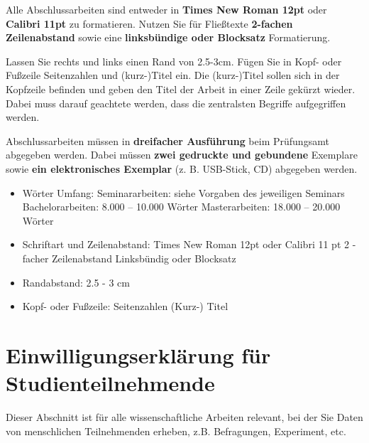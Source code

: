 \documentclass[
  letterpaper,
  DIV=11]{scrreprt}
\begin{document}
Alle Abschlussarbeiten sind entweder in \textbf{Times New Roman 12pt}
oder \textbf{Calibri 11pt} zu formatieren. Nutzen Sie für Fließtexte
\textbf{2-fachen Zeilenabstand} sowie eine \textbf{linksbündige oder
Blocksatz} Formatierung.

Lassen Sie rechts und links einen Rand von 2.5-3cm. Fügen Sie in Kopf-
oder Fußzeile Seitenzahlen und (kurz-)Titel ein. Die (kurz-)Titel sollen
sich in der Kopfzeile befinden und geben den Titel der Arbeit in einer
Zeile gekürzt wieder. Dabei muss darauf geachtete werden, dass die
zentralsten Begriffe aufgegriffen werden.

Abschlussarbeiten müssen in \textbf{dreifacher Ausführung} beim
Prüfungsamt abgegeben werden. Dabei müssen \textbf{zwei gedruckte und
gebundene} Exemplare sowie \textbf{ein elektronisches Exemplar} (z. B.
USB-Stick, CD) abgegeben werden.

\begin{tcolorbox}[enhanced jigsaw, rightrule=.15mm, colframe=quarto-callout-note-color-frame, opacityback=0, toptitle=1mm, colbacktitle=quarto-callout-note-color!10!white, breakable, titlerule=0mm, colback=white, arc=.35mm, toprule=.15mm, leftrule=.75mm, bottomtitle=1mm, coltitle=black, left=2mm, title=\textcolor{quarto-callout-note-color}{\faInfo}\hspace{0.5em}{Checkliste Formalien}, bottomrule=.15mm, opacitybacktitle=0.6]

\begin{itemize}
\item
  Wörter Umfang: Seminararbeiten: siehe Vorgaben des jeweiligen Seminars
  Bachelorarbeiten: 8.000 -- 10.000 Wörter Masterarbeiten: 18.000 --
  20.000 Wörter
\item
  Schriftart und Zeilenabstand: Times New Roman 12pt oder Calibri 11 pt
  2 - facher Zeilenabstand Linksbündig oder Blocksatz
\item
  Randabstand: 2.5 - 3 cm
\item
  Kopf- oder Fußzeile: Seitenzahlen (Kurz-) Titel
\end{itemize}

\end{tcolorbox}

\section{Einwilligungserklärung für
Studienteilnehmende}\label{einwilligungserkluxe4rung-fuxfcr-studienteilnehmende}

Dieser Abschnitt ist für alle wissenschaftliche Arbeiten relevant, bei
der Sie Daten von menschlichen Teilnehmenden erheben, z.B. Befragungen,
Experiment, etc.
\end{document}
